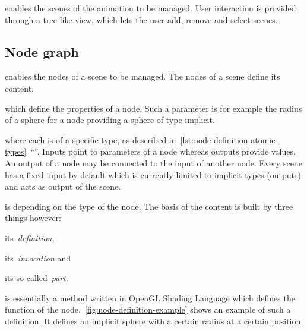 \documentclass[%
    a4paper,    %
    justified,  %
    nobib,      %
    openany     %
]{tufte-book}
\makeatletter
\renewcommand{\label}[1]{\@tufte@label{##1}}%
\makeatother
\begin{document}
 enables the scenes of the animation to be
managed. User interaction is provided through a tree-like view, which lets the
user add, remove and select scenes.

\subsection{Node graph}
\label{results:subsec:program:node-graph}

%

 enables the nodes of a scene to be
managed. The nodes of a scene define its content.

 which define the properties of a node.
Such a parameter is for example the radius of a sphere for a node providing a
sphere of type implicit.

 where each is of a
specific type, as described
in~\cref{lst:node-definition-atomic-types}~\enquote{}.
Inputs point to parameters of a node whereas outputs provide values. An output
of a node may be connected to the input of another node. Every scene has a fixed
input by default which is currently limited to implicit types (outputs) and acts
as output of the scene.

 is depending on the type of the
node. The basis of the content is built by three things however:
\begin{enumerate*}
  \item its~\emph{definition},
  \item its~\emph{invocation} and
  \item its so called~\emph{part}.
\end{enumerate*}

 is essentially a method written in OpenGL
Shading Language which defines the function of the
node.~\cref{fig:node-definition-example} shows an example of such a definition.
It defines an implicit sphere with a certain radius at a certain position.
\end{document}
